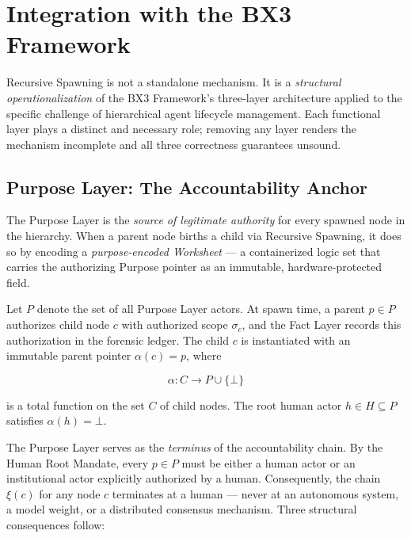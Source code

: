 \section{Integration with the BX3 Framework}
\label{sec:bx3-integration}

Recursive Spawning is not a standalone mechanism. It is a \textit{structural operationalization} of the BX3 Framework's three-layer architecture applied to the specific challenge of hierarchical agent lifecycle management. Each functional layer plays a distinct and necessary role; removing any layer renders the mechanism incomplete and all three correctness guarantees unsound.

\subsection{Purpose Layer: The Accountability Anchor}
\label{sec:purpose-anchor}

The Purpose Layer is the \textit{source of legitimate authority} for every spawned node in the hierarchy. When a parent node births a child via Recursive Spawning, it does so by encoding a \textit{purpose-encoded Worksheet} — a containerized logic set that carries the authorizing Purpose pointer as an immutable, hardware-protected field.

Let $P$ denote the set of all Purpose Layer actors. At spawn time, a parent $p \in P$ authorizes child node $c$ with authorized scope $\sigma_c$, and the Fact Layer records this authorization in the forensic ledger. The child $c$ is instantiated with an immutable parent pointer $\alpha(c) = p$, where

\begin{equation}
\alpha : C \rightarrow P \cup \{\bot\}
\tag{1}
\end{equation}

is a total function on the set $C$ of child nodes. The root human actor $h \in H \subseteq P$ satisfies $\alpha(h) = \bot$.

The Purpose Layer serves as the \textit{terminus} of the accountability chain. By the Human Root Mandate, every $p \in P$ must be either a human actor or an institutional actor explicitly authorized by a human. Consequently, the chain $\xi(c)$ for any node $c$ terminates at a human — never at an autonomous system, a model weight, or a distributed consensus mechanism. Three structural consequences follow:

